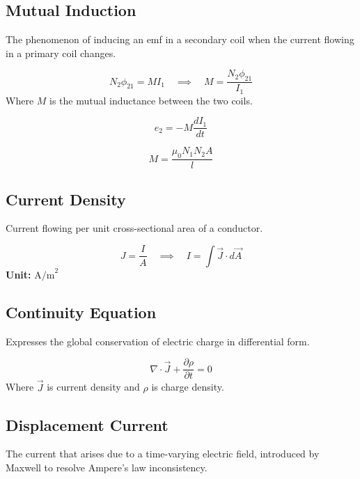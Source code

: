 \documentclass[11pt,a4paper]{article}
\begin{document}
\subsection{Mutual Induction}
The phenomenon of inducing an emf in a secondary coil when the current flowing in a primary coil changes.
\begin{formulabox}
    \[ N_2 \phi_{21} = M I_1 \quad \implies \quad M = \frac{N_2 \phi_{21}}{I_1} \]
    Where $M$ is the mutual inductance between the two coils.
\end{formulabox}

\begin{formulabox}
    \[ e_2 = -M\frac{dI_1}{dt} \]
\end{formulabox}

\begin{formulabox}
    \[ M = \frac{\mu_0 N_1 N_2 A}{l} \]
\end{formulabox}

\subsection{Current Density}
Current flowing per unit cross-sectional area of a conductor.
\begin{formulabox}
    \[ J = \frac{I}{A} \quad \implies \quad I = \int \vec{J} \cdot d\vec{A} \]
    \textbf{Unit:} $\text{A/m}^2$
\end{formulabox}

\subsection{Continuity Equation}
\begin{pyqbox}
    Expresses the global conservation of electric charge in differential form.
\end{pyqbox}

\begin{formulabox}
    \[ \nabla \cdot \vec{J} + \frac{\partial\rho}{\partial t} = 0 \]
    Where $\vec{J}$ is current density and $\rho$ is charge density.
\end{formulabox}

\subsection{Displacement Current}
\begin{pyqbox}
    The current that arises due to a time-varying electric field, introduced by Maxwell to resolve Ampere's law inconsistency.
\end{pyqbox}
\end{document}
